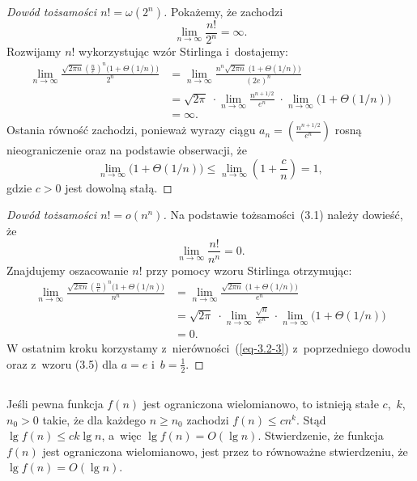 \begin{proof}[Dowód tożsamości $n!=\omega(2^n)$]
	Pokażemy, że zachodzi
	\[
		\lim_{n\to\infty}\frac{n!}{2^n} = \infty.
	\]
	Rozwijamy $n!$ wykorzystując wzór Stirlinga i~dostajemy:
	\begin{align*}
		\lim_{n\to\infty}\frac{\sqrt{2\pi n}\left(\frac{n}{e}\right)^n\bigl(1+\Theta(1/n)\bigr)}{2^n} &= \lim_{n\to\infty}\frac{n^n\sqrt{2\pi n}\;\bigl(1+\Theta(1/n)\bigr)}{(2e)^n} \\
		&= \sqrt{2\pi}\;\cdot\lim_{n\to\infty}\frac{n^{n+1/2}}{e^n}\;\cdot\lim_{n\to\infty}\bigl(1+\Theta(1/n)\bigr) \\
		&= \infty.
	\end{align*}
	Ostania równość zachodzi, ponieważ wyrazy ciągu $a_n=\left(\frac{n^{n+1/2}}{e^n}\right)$ rosną nieograniczenie oraz na podstawie obserwacji, że
	\begin{equation}\label{eq-3.2-3}
		\lim_{n\to\infty}\bigl(1+\Theta(1/n)\bigr) \le \lim_{n\to\infty}\left(1+\frac{c}{n}\right) = 1,
	\end{equation}
	gdzie $c>0$ jest dowolną stałą.
\end{proof}

\begin{proof}[Dowód tożsamości $n!=o(n^n)$]
	Na podstawie tożsamości~(3.1) należy dowieść, że
	\[
		\lim_{n\to\infty}\frac{n!}{n^n} = 0.
	\]
	Znajdujemy oszacowanie $n!$ przy pomocy wzoru Stirlinga otrzymując:
	\begin{align*}
		\lim_{n\to\infty}\frac{\sqrt{2\pi n}\left(\frac{n}{e}\right)^n\bigl(1+\Theta(1/n)\bigr)}{n^n} &= \lim_{n\to\infty}\frac{\sqrt{2\pi n}\;\bigl(1+\Theta(1/n)\bigr)}{e^n} \\
		&= \sqrt{2\pi}\;\cdot\lim_{n\to\infty}\frac{\sqrt{n}}{e^n}\;\cdot\lim_{n\to\infty}\bigl(1+\Theta(1/n)\bigr) \\
		&= 0.
	\end{align*}
	W ostatnim kroku korzystamy z~nierówności~(\ref{eq-3.2-3}) z~poprzedniego dowodu oraz z~wzoru (3.5) dla $a=e$ i~$b=\frac{1}{2}$.
\end{proof}

\subsection{} %
Jeśli pewna funkcja $f(n)$ jest ograniczona wielomianowo, to istnieją stałe $c$,~$k$,~$n_0>0$ takie, że dla każdego $n\ge n_0$ zachodzi $f(n)\le cn^k$. Stąd $\lg f(n)\le ck\lg n$, a~więc $\lg f(n)=O(\lg n)$. Stwierdzenie, że funkcja $f(n)$ jest ograniczona wielomianowo, jest przez to  równoważne stwierdzeniu, że $\lg f(n)=O(\lg n)$.

